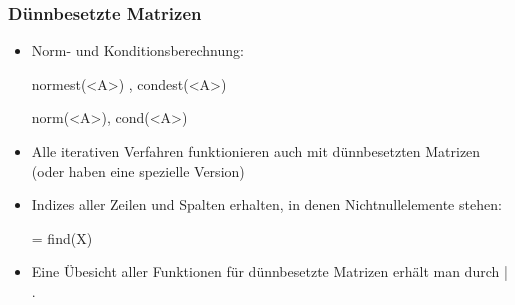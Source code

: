 \documentclass[hyperref={xetex}]{beamer}
\begin{document}
% 
%
\begin{frame}[fragile]\frametitle{D\"unnbesetzte Matrizen}
\begin{itemize}
\item Norm- und Konditionsberechnung:
\begin{matlabin}
normest(<A>) , condest(<A>)
\end{matlabin}
\begin{pyin}
norm(<A>), cond(<A>)  
\end{pyin}

\item Alle iterativen Verfahren funktionieren auch mit d\"unnbesetzten
  Matrizen (oder haben eine spezielle Version) 
\item Indizes aller Zeilen und Spalten erhalten, in denen Nichtnullelemente stehen: 
\begin{matlabin}
[I,J] = find(X)
\end{matlabin}
\item Eine \"Ubesicht aller Funktionen f\"ur d\"unnbesetzte Matrizen erh\"alt
  man durch \alert{ | }.  
\end{itemize}
\end{frame}
\end{document}
